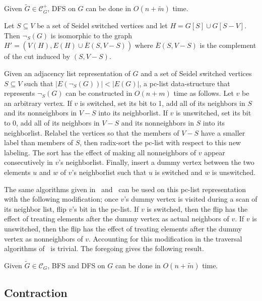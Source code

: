 \documentclass{llncs}
\begin{document}
\begin{theorem}
\cite{DahlhausGM02,LindzeyO13} Given $\widetilde{G} \in \mathcal{C}^+_G$, DFS on $G$ can be done in $O(n+\widetilde{m})$ time.
\end{theorem}
\begin{proposition}
Let $S \subseteq V$ be a set of Seidel switched vertices and let $H = G[S] \cup G[S-V]$.  Then $\neg_S(G)$ is isomorphic to the graph $H' = (V(H),E(H) \cup \overline{E}(S,V-S))$ where $\overline{E}(S,V-S)$ is the complement of the cut induced by $(S,V-S)$.
\end{proposition}
Given an adjacency list representation of $G$ and a set of Seidel switched vertices $S \subseteq V$ such that $|E(\neg_S(G))| < |E(G)|$, a pc-list data-structure that represents $\neg_S(G)$ can be constructed in $O(n+m)$ time as follows.  Let $v$ be an arbitrary vertex. If $v$ is switched, set its bit to 1, add all of its neighbors in $S$ and its nonneighbors in $V-S$ into its neighborlist.  If $v$ is unswitched, set its bit to 0, add all of its neighbors in $V-S$ and its nonneighbors in $S$ into its neighborlist. Relabel the vertices so that the members of $V-S$ have a smaller label than members of $S$, then radix-sort the pc-list with respect to this new labeling.  The sort has the effect of making all nonneighbors of $v$ appear consecutively in $v$'s neighborlist.  Finally, insert a dummy vertex between the two elements $u$ and $w$ of $v$'s neighborlist such that $u$ is switched and $w$ is unswitched.

The same algorithms given in~\cite{DahlhausGM02} and~\cite{LindzeyO13} can be used on this pc-list representation with the following modification; once $v$'s dummy vertex is visited during a scan of its neighbor list, flip $v$'s bit in the pc-list.  If $v$ is switched, then the flip has the effect of treating elements after the dummy vertex as actual neighbors of $v$. If $v$ is unswitched, then the flip has the effect of treating elements after the dummy vertex as nonneighbors of $v$.  Accounting for this modification in the traversal algorithms of~\cite{DahlhausGM02,LindzeyO13} is trivial.  The foregoing gives the following result.
\begin{theorem}
Given $\widetilde{G} \in \mathcal{C}_G$, BFS and DFS on $G$ can be done in $O(n+\widetilde{m})$ time.
\end{theorem}

\subsection{Contraction}
\end{document}
